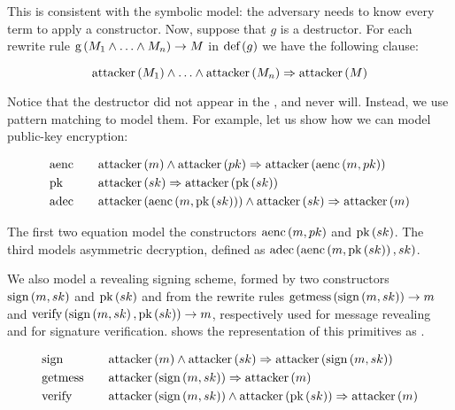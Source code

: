 This is consistent with the symbolic model: the adversary needs to know every term to apply a constructor.
Now, suppose that $g$ is a destructor. For each rewrite rule $\mbox{g}\left(M_1 \land \ldots \land M_n\right) \rightarrow M$ in $\mbox{def}\left(g\right)$ we have the following clause:

\begin{equation}
  \mbox{attacker}\left(M_1\right) \land \ldots \land \mbox{attacker}\left(M_n\right) \Rightarrow \mbox{attacker}\left(M\right)
\end{equation}

Notice that the destructor did not appear in the \Hornc{}, and never will. Instead, we use pattern matching to model them. For example, let us show how we can model public-key encryption:

\begin{equation}
  \begin{alignedat}{3}
    & \mbox{aenc} \qquad && \mbox{attacker}\left(m\right) \land \mbox{attacker}\left(pk\right) \Rightarrow \mbox{attacker}\left(\mbox{aenc}\left(m, pk\right)\right)            \\
    & \mbox{pk} \qquad   && \mbox{attacker}\left(sk\right) \Rightarrow \mbox{attacker}\left(\mbox{pk}\left(sk\right)\right)                                  \\
    & \mbox{adec} \qquad && \mbox{attacker}\left(\mbox{aenc}\left(m, \mbox{pk}\left(sk\right)\right)\right) \land \mbox{attacker}\left(sk\right) \Rightarrow \mbox{attacker}\left(m\right)
  \end{alignedat}
\end{equation}

The first two equation model the constructors $\mbox{aenc}\left(m, pk\right)$ and $\mbox{pk}\left(sk\right)$. The third models asymmetric decryption, defined as $\mbox{adec}\left(\mbox{aenc}\left(m, \mbox{pk}\left(sk\right)\right), sk\right)$.

\sloppy We also model a revealing signing scheme, formed by two constructors $\mbox{sign}\left(m, sk\right)$ and $\mbox{pk}\left(sk\right)$ and from the rewrite rules $\mbox{getmess}\left(\mbox{sign}\left(m, sk\right)\right) \rightarrow m$ and $\mbox{verify}\left(\mbox{sign}\left(m, sk\right), \mbox{pk}\left(sk\right)\right) \rightarrow m$, respectively used for message revealing and for signature verification.  shows the representation of this primitives as \Horncs{}.

\begin{equation}
  \label{eq:signing-horn-clauses}
  \begin{alignedat}{3}
    & \mbox{sign} \qquad    && \mbox{attacker}\left(m\right) \land \mbox{attacker}\left(sk\right) \Rightarrow \mbox{attacker}\left(\mbox{sign}\left(m, sk\right)\right)            \\
    & \mbox{getmess} \qquad && \mbox{attacker}\left(\mbox{sign}\left(m, sk\right)\right) \Rightarrow \mbox{attacker}\left(m\right)                              \\
    & \mbox{verify} \qquad  && \mbox{attacker}\left(\mbox{sign}\left(m, sk\right)\right) \land \mbox{attacker}\left(\mbox{pk}\left(sk\right)\right) \Rightarrow \mbox{attacker}\left(m\right)
  \end{alignedat}
\end{equation}

